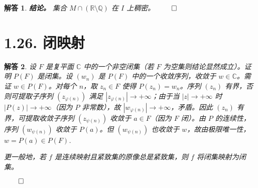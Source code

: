 \documentclass[12pt,UTF8]{ctexbook}
\theoremstyle{exercisestyle}
\theoremstyle{solutionstyle}
\newtheorem*{solution*}{解答}
\newenvironment{solution}
  {\begin{solution*}}
  {\hfill\ensuremath{\qed}\end{solution*}}
\begin{document}
\begin{solution}
  \textbf{结论。} 集合 \( M \cap (\mathbb{R} \setminus \mathbb{Q}) \) 在 \( I \) 上稠密。
\end{solution}

\section{1.26. 闭映射}\label{application-fermee}
\begin{solution}
  设 \( F \) 是复平面 \( \mathbb{C} \) 中的一个非空闭集（若 \( F \) 为空集则结论显然成立）。证明 \( P(F) \) 是闭集。设 \( (w_n) \) 是 \( P(F) \) 中的一个收敛序列，收敛于 \( w \in \mathbb{C} \)。需证 \( w \in P(F) \)。对每个 \( n \)，取 \( z_n \in F \) 使得 \( P(z_n) = w_n \)。序列 \( (z_n) \) 有界，否则可提取子序列 \( (z_{\varphi(n)}) \) 满足 \( |z_{\varphi(n)}| \to +\infty \)；由于当 \( |z| \to +\infty \) 时 \( |P(z)| \to +\infty \)（因为 \( P \) 非常数），故 \( |w_{\varphi(n)}| \to +\infty \)，矛盾。因此 \( (z_n) \) 有界，可提取收敛子序列 \( (z_{\psi(n)}) \) 收敛于 \( a \in F \)（因为 \( F \) 闭）。由 \( P \) 的连续性，序列 \( (w_{\psi(n)}) \) 收敛于 \( P(a) \)。但 \( (w_{\psi(n)}) \) 也收敛于 \( w \)，故由极限唯一性，\( w = P(a) \in P(F) \).

  更一般地，若 \( f \) 是连续映射且紧致集的原像总是紧致集，则 \( f \) 将闭集映射为闭集。

\end{solution}
\end{document}
